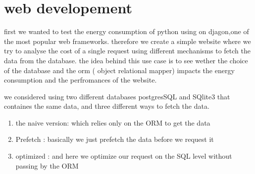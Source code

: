 











\section{web developement}
first we wanted to test the energy consumption of python using on djagon,one of the most popular web frameworks.
therefore we create a simple website where we try to analyse the cost of a single request using different mechanisms to fetch the data from the database.
the idea behind this use case is to see wether the choice of the database and the orm ( object relational mapper) impacts the energy consumption and the perfromances of the website.

we considered using two different databases postgresSQL and SQlite3 that containes the same data, and three different ways to fetch the data.
\begin{enumerate}
    \item the naive version: which relies only on the ORM to get the data
    \item Prefetch : basically we just prefetch the data before we request it
    \item optimized : and here we optimize our request on the SQL level without passing by the ORM
\end{enumerate}


